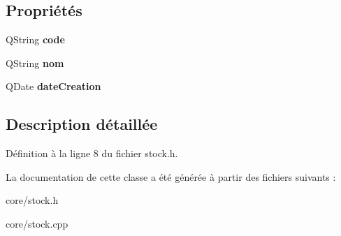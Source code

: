 \subsection*{Propriétés}
\begin{DoxyCompactItemize}
\item 
\hypertarget{class_core_1_1_stock_a0b685816b48d59f6aa5aa149fec7d70e}{
QString {\bfseries code}}
\label{d6/d24/class_core_1_1_stock_a0b685816b48d59f6aa5aa149fec7d70e}

\item 
\hypertarget{class_core_1_1_stock_a1e1402caa5271ecee32a2e86f26f8223}{
QString {\bfseries nom}}
\label{d6/d24/class_core_1_1_stock_a1e1402caa5271ecee32a2e86f26f8223}

\item 
\hypertarget{class_core_1_1_stock_a8ad2b7a5946a36b7f6afc3e3fd7a6abb}{
QDate {\bfseries dateCreation}}
\label{d6/d24/class_core_1_1_stock_a8ad2b7a5946a36b7f6afc3e3fd7a6abb}

\end{DoxyCompactItemize}


\subsection{Description détaillée}


Définition à la ligne 8 du fichier stock.h.



La documentation de cette classe a été générée à partir des fichiers suivants :\begin{DoxyCompactItemize}
\item 
core/stock.h\item 
core/stock.cpp\end{DoxyCompactItemize}
